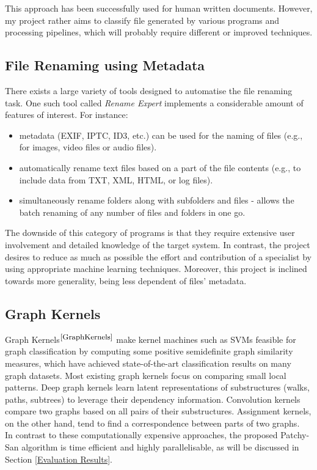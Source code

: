 This approach has been successfully used for human written documents. However, my project rather aims to classify file generated by various programs and processing pipelines, which will probably require different or improved techniques. \\

\subsection{File Renaming using Metadata}

There exists a large variety of tools designed to automatise the file renaming task. One such tool called \textit{Rename Expert} implements a considerable amount of features of interest. For instance:

\begin{itemize}
  \item metadata (EXIF, IPTC, ID3, etc.) can be used for the naming of files (e.g., for images, video files or audio files).
  \item automatically rename text files based on a part of the file contents (e.g., to include data from TXT, XML, HTML, or log files).
  \item simultaneously rename folders along with subfolders and files - allows the batch renaming of any number of files and folders in one go.
\end{itemize}

The downside of this category of programs is that they require extensive user involvement and detailed knowledge of the target system. In contrast, the project desires to reduce as much as possible the effort and contribution of a specialist by using appropriate machine learning techniques. Moreover, this project is inclined towards more generality, being less dependent of files' metadata. \\


\subsection{Graph Kernels}

Graph Kernels$^{\small \cite{GraphKernels}}$ make kernel machines such as SVMs feasible for graph classification by computing some positive semidefinite graph similarity measures, which have achieved state-of-the-art classification results on many graph datasets. Most existing graph kernels focus on comparing small local patterns. Deep graph kernels learn latent representations of substructures (walks, paths, subtrees) to leverage their dependency information. Convolution kernels compare two graphs based on all pairs of their substructures. Assignment kernels, on the other hand, tend to find a correspondence between parts of two graphs. \\

In contrast to these computationally expensive approaches, the proposed Patchy-San algorithm is time efficient and highly parallelisable, as will be discussed in Section \ref{Evaluation Results}.

